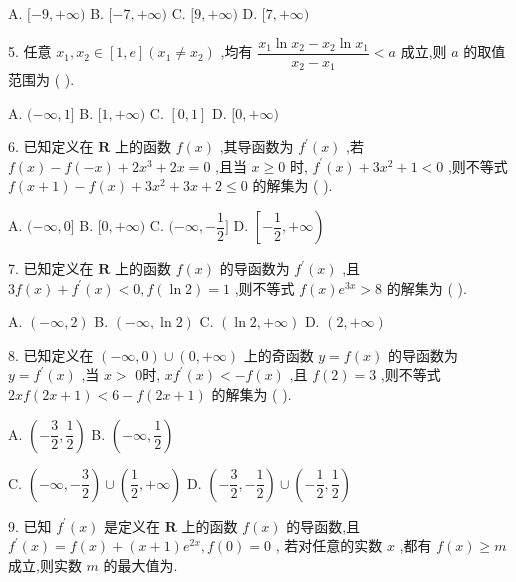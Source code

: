A. $\lbrack  - 9, + \infty )$ B. $\lbrack  - 7, + \infty )$ C. $\lbrack 9, + \infty )$ D. $\lbrack 7, + \infty )$

5. 任意 ${x}_{1},{x}_{2} \in  \left\lbrack  {1,{e}}\right\rbrack  \left( {{x}_{1} \neq  {x}_{2}}\right)$ ,均有 $\dfrac{{x}_{1}\ln {x}_{2} - {x}_{2}\ln {x}_{1}}{{x}_{2} - {x}_{1}} < a$ 成立,则 $a$ 的取值范围为 (   ).

A. $( - \infty ,1\rbrack$ B. $\lbrack 1, + \infty )$ C. $\left\lbrack  {0,1}\right\rbrack$ D. $\lbrack 0, + \infty )$

6. 已知定义在 $\mathbf{R}$ 上的函数 $f\left( x\right)$ ,其导函数为 ${f}^{\prime }\left( x\right)$ ,若 $f\left( x\right)  - f\left( {-x}\right)  + 2{x}^{3} + {2x} = 0$ ,且当 $x \geq  0$ 时, ${f}^{\prime }\left( x\right)  + 3{x}^{2} + 1 < 0$ ,则不等式 $f\left( {x + 1}\right)  - f\left( x\right)  + 3{x}^{2} + {3x} + 2 \leq  0$ 的解集为 (   ).

A. $( - \infty ,0\rbrack$ B. $\lbrack 0, + \infty )$ C. $( - \infty , - \dfrac{1}{2}\rbrack$ D. $\left\lbrack  {-\dfrac{1}{2}, + \infty }\right)$

7. 已知定义在 $\mathbf{R}$ 上的函数 $f\left( x\right)$ 的导函数为 ${f}^{\prime }\left( x\right)$ ,且 ${3f}\left( x\right)  + {f}^{\prime }\left( x\right)  < 0,f\left( {\ln 2}\right)  = 1$ ,则不等式 $f\left( x\right) {{e}}^{3x} > 8$ 的解集为 (   ).

A. $\left( {-\infty ,2}\right)$ B. $\left( {-\infty ,\ln 2}\right)$ C. $\left( {\ln 2, + \infty }\right)$ D. $\left( {2, + \infty }\right)$

8. 已知定义在 $\left( {-\infty ,0}\right)  \cup  \left( {0, + \infty }\right)$ 上的奇函数 $y = f\left( x\right)$ 的导函数为 $y = {f}^{\prime }\left( x\right)$ ,当 $x >$ 0时, $x{f}^{\prime }\left( x\right)  <  - f\left( x\right)$ ,且 $f\left( 2\right)  = 3$ ,则不等式 ${2xf}\left( {{2x} + 1}\right)  < 6 - f\left( {{2x} + 1}\right)$ 的解集为 (   ).

A. $\left( {-\dfrac{3}{2},\dfrac{1}{2}}\right)$ B. $\left( {-\infty ,\dfrac{1}{2}}\right)$

C. $\left( {-\infty , - \dfrac{3}{2}}\right)  \cup  \left( {\dfrac{1}{2}, + \infty }\right)$ D. $\left( {-\dfrac{3}{2}, - \dfrac{1}{2}}\right)  \cup  \left( {-\dfrac{1}{2},\dfrac{1}{2}}\right)$

9. 已知 ${f}^{\prime }\left( x\right)$ 是定义在 $\mathbf{R}$ 上的函数 $f\left( x\right)$ 的导函数,且 ${f}^{\prime }\left( x\right)  = f\left( x\right)  + \left( {x + 1}\right) {{e}}^{2x},f\left( 0\right)  = 0$ , 若对任意的实数 $x$ ,都有 $f\left( x\right)  \geq  m$ 成立,则实数 $m$ 的最大值为\blkda{}.

